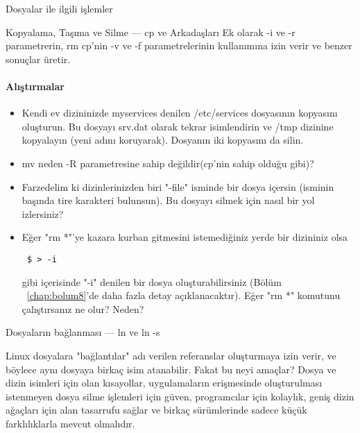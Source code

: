 \begin{section}{Dosyalar ile ilgili işlemler}
\begin{subsection}{Kopyalama, Taşıma ve Silme — cp ve Arkadaşları}
Ek olarak -i ve -r parametrerin, rm cp'nin -v ve -f parametrelerinin kullanımına izin verir ve benzer sonuçlar üretir.

\paragraph{Alıştırmalar}{
\begin{itemize}
 \item Kendi ev dizininizde myservices denilen /etc/services dosyasının kopyasını oluşturun. Bu dosyayı srv.dat olarak tekrar isimlendirin ve /tmp dizinine kopyalayın (yeni adını koruyarak). Dosyanın iki kopyasını da silin.
 \item mv neden -R parametresine sahip değildir(cp'nin sahip olduğu gibi)?
 \item Farzedelim ki dizinlerinizden biri "-file" isminde bir dosya içersin (isminin başında tire karakteri bulunsun). Bu dosyayı silmek için nasıl bir yol izlersiniz?
 \item Eğer "rm *"'ye kazara kurban gitmesini istemediğiniz yerde bir dizininiz olsa \begin{verbatim}
 $ > -i
 \end{verbatim}gibi içerisinde "-i" denilen bir dosya oluşturabilirsiniz (Bölüm ~\ref{chap:bolum8}'de daha fazla detay açıklanacaktır). Eğer "rm *" komutunu çalıştırsanız ne olur? Neden?
\end{itemize}}
\end{subsection}
\begin{subsection}{Dosyaların bağlanması — ln ve ln -s}
\label{sec:bolum642}

Linux dosyalara "bağlantılar" adı verilen referanslar oluşturmaya izin verir, ve böylece aynı dosyaya birkaç isim atanabilir. Fakat bu neyi amaçlar? Dosya ve dizin isimleri için olan kısayollar, uygulamaların erişmesinde oluşturulması istenmeyen dosya silme işlemleri için güven, programcılar için kolaylık, geniş dizin ağaçları için alan tasarrufu sağlar ve birkaç sürümlerinde sadece küçük farklılıklarla mevcut olmalıdır.


\end{subsection}
\end{section}
